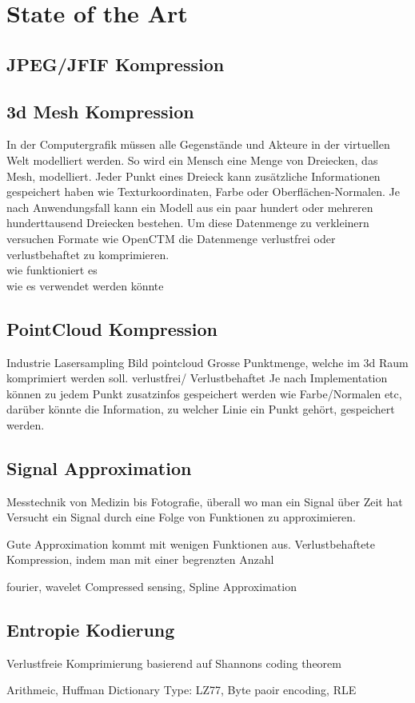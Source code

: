 \section{State of the Art}
\subsection{JPEG/JFIF Kompression}

\subsection{3d Mesh Kompression}
In der Computergrafik müssen alle Gegenstände und Akteure in der virtuellen Welt modelliert werden. So wird ein Mensch eine Menge von Dreiecken, das Mesh, modelliert. Jeder Punkt eines Dreieck kann zusätzliche Informationen gespeichert haben wie Texturkoordinaten, Farbe oder Oberflächen-Normalen. Je nach Anwendungsfall kann ein Modell aus ein paar hundert oder mehreren hunderttausend Dreiecken bestehen. Um diese Datenmenge zu verkleinern versuchen Formate wie OpenCTM \cite{website:openctm} die Datenmenge verlustfrei oder verlustbehaftet zu komprimieren.\\[\baselineskip]
wie funktioniert es\\
[\baselineskip]

wie es verwendet werden könnte

\subsection{PointCloud Kompression}
Industrie Lasersampling
Bild pointcloud
Grosse Punktmenge, welche im 3d Raum komprimiert werden soll.
verlustfrei/ Verlustbehaftet
Je nach Implementation können zu jedem Punkt zusatzinfos gespeichert werden wie Farbe/Normalen etc, darüber könnte die Information, zu welcher Linie ein Punkt gehört, gespeichert werden.

\subsection{Signal Approximation}
Messtechnik von Medizin bis Fotografie, überall wo man ein Signal über Zeit hat
Versucht ein Signal durch eine Folge von Funktionen zu approximieren.

Gute Approximation kommt mit wenigen Funktionen aus.
Verlustbehaftete Kompression, indem man mit einer begrenzten Anzahl

fourier, wavelet Compressed sensing, Spline Approximation

\subsection{Entropie Kodierung}
Verlustfreie Komprimierung basierend auf Shannons coding theorem

 Arithmeic, Huffman
Dictionary Type: LZ77, Byte paoir encoding, RLE
